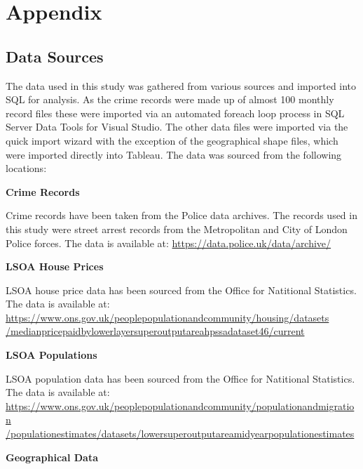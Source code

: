 \documentclass{article}
\begin{document}
\newpage
\section{Appendix} \label{Appendix}

\subsection{Data Sources}
The data used in this study was gathered from various sources and imported into SQL for analysis. As the crime records were made up of almost 100 monthly record files these were imported via an automated foreach loop process in SQL Server Data Tools for Visual Studio. The other data files were imported via the quick import wizard with the exception of the geographical shape files, which were imported directly into Tableau. The data was sourced from the following locations:
\newline

\noindent
\textbf{Crime Records}

Crime records have been taken from the Police data archives. The records used in this study were street arrest records from the Metropolitan and City of London Police forces. The data is available at:
\newline
\href{url}{https://data.police.uk/data/archive/ }
\newline

\noindent
\textbf{LSOA House Prices}

LSOA house price data has been sourced from the Office for Natitional Statistics. The data is available at:
\newline
\href{url}{https://www.ons.gov.uk/peoplepopulationandcommunity/housing/datasets
/medianpricepaidbylowerlayersuperoutputareahpssadataset46/current}
\newline

\noindent
\textbf{LSOA Populations}

LSOA population data has been sourced from the Office for Natitional Statistics. The data is available at:
\newline
\href{url}{https://www.ons.gov.uk/peoplepopulationandcommunity/populationandmigration
/populationestimates/datasets/lowersuperoutputareamidyearpopulationestimates}
\newline

\noindent
\textbf{Geographical Data}
\end{document}
